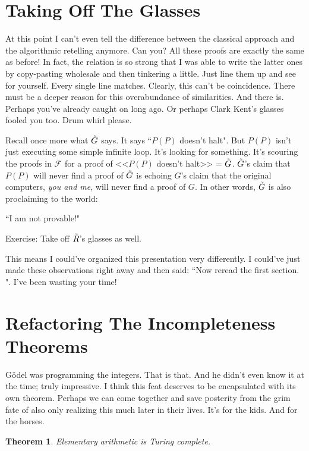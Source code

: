 \documentclass{article}
\theoremstyle{theorem}
\newtheorem{theorem}{Theorem}
\newcommand{\infi}[1]{\accentset{\scalebox{0.35}{$\infty$}}{#1}}
\begin{document}
\section{Taking Off The Glasses}

At this point I can't even tell the difference between the classical approach and the algorithmic retelling anymore. Can you? All these proofs are exactly the same as before! In fact, the relation is so strong that I was able to write the latter ones by copy-pasting wholesale and then tinkering a little. Just line them up and see for yourself. Every single line matches. Clearly, this can't be coincidence. There must be a deeper reason for this overabundance of similarities. And there is. Perhaps you've already caught on long ago. Or perhaps Clark Kent's glasses fooled you too. Drum whirl please.

Recall once more what $\infi{G}$ says. It says ``$P(P)$ doesn't halt". But $P(P)$ isn't just executing some simple infinite loop. It's looking for something. It's scouring the proofs in $\mathcal{F}$ for a proof of <<$P(P)$ doesn't halt>> = $\infi{G}$. $\infi{G}$'s claim that $P(P)$ will never find a proof of $\infi{G}$ is echoing $G$'s claim that the original computers, \textit{you and me}, will never find a proof of $G$. In other words, $\infi{G}$ is also proclaiming to the world:
\begin{center}
``I am not provable!"
\end{center}
Exercise: Take off $\infi{R}$'s glasses as well.

This means I could've organized this presentation very differently. I could've just made these observations right away and then said: ``Now reread the first section. \scalebox{0.9}{$\square$}". I've been wasting your time!

\section{Refactoring The Incompleteness Theorems}

Gödel was programming the integers. That is that. And he didn't even know it at the time; truly impressive. I think this feat deserves to be encapsulated with its own theorem. Perhaps we can come together and save posterity from the grim fate of also only realizing this much later in their lives. It's for the kids. And for the horses.

\begin{theorem}
Elementary arithmetic is Turing complete.
\end{theorem}
\end{document}
